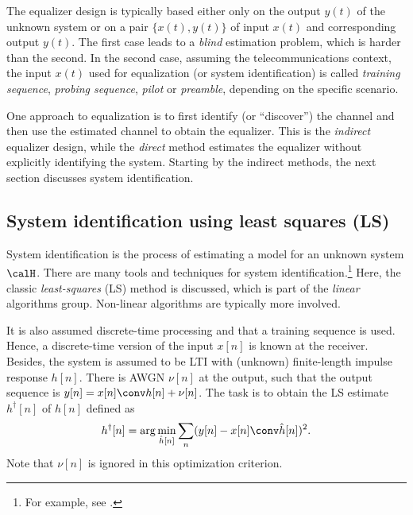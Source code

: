 The equalizer design is typically based either only on the output $y(t)$ of the unknown system or on a pair $\{x(t),y(t)\}$ of input $x(t)$ and corresponding output $y(t)$. The first case leads to a \emph{blind} estimation problem, which is harder than the second. In the second case, assuming the telecommunications context, the input $x(t)$ used for equalization (or system identification) is called \emph{training sequence}, \emph{probing sequence}, \emph{pilot} or \emph{preamble}, depending on the specific scenario.

One approach to equalization is to first identify (or ``discover'') the channel and then use the estimated
channel to obtain the equalizer. This is the \emph{indirect} equalizer design, while the
\emph{direct} method estimates the equalizer without explicitly identifying the system.
Starting by the indirect methods, the next section discusses system identification.

\subsection{System identification using least squares (LS)}
\label{sec:ls_estimation}

System identification is the process of estimating a model for an unknown system $\calH$. 
There are many tools and techniques for system identification.\footnote{For example, see  .}
Here, the classic \emph{least-squares} (LS) method is discussed, which is part of the \emph{linear} algorithms group. Non-linear algorithms are typically more involved. 

It is also assumed discrete-time processing and that a training sequence is used. Hence, a discrete-time version of the input $x[n]$ is known at the receiver. Besides, the system is assumed to be LTI with (unknown) finite-length impulse response $h[n]$. There is AWGN $\nu[n]$ at the output, such that the output sequence is $y[n] = x[n] \conv h[n] + \nu[n]$. The task is to obtain the LS estimate $h^\dag[n]$ of $h[n]$ defined as
\begin{equation}
h^\dag[n] = \arg \min_{\hat h[n]} \sum_{n} (y[n] - x[n] \conv \hat h[n])^2.
\label{eq:ls_estimation}
\end{equation}
Note that $\nu[n]$ is ignored in this optimization criterion.


